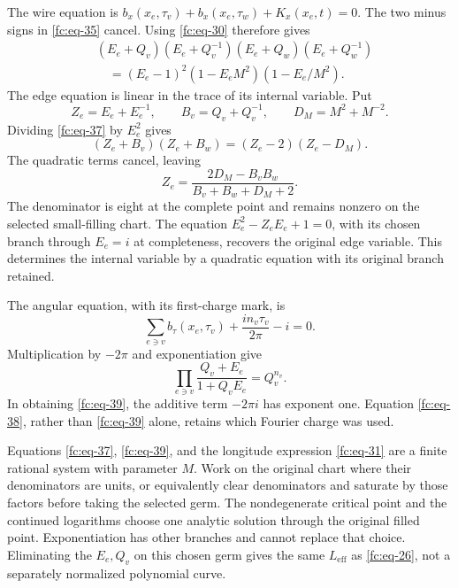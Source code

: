 The wire equation is \(b_x(x_e,\tau_v)+b_x(x_e,\tau_w)+K_x(x_e,t)=0\). The two minus signs in \eqref{fc:eq-35} cancel. Using \eqref{fc:eq-30} therefore gives
\begin{equation}\label{fc:eq-37}
\begin{aligned}
 &(E_e+Q_v)(E_e+Q_v^{-1})
   (E_e+Q_w)(E_e+Q_w^{-1})\\
 &\quad=(E_e-1)^2(1-E_eM^2)(1-E_e/M^2).
 \end{aligned}
\end{equation}
 The edge equation is linear in the trace of its internal variable. Put
\begin{equation}\label{fc:eq-37a}
Z_e=E_e+E_e^{-1},\qquad B_v=Q_v+Q_v^{-1},\qquad
 D_M=M^2+M^{-2}.
\end{equation}
 Dividing \eqref{fc:eq-37} by \(E_e^2\) gives \[
 (Z_e+B_v)(Z_e+B_w)=(Z_e-2)(Z_e-D_M).
\] The quadratic terms cancel, leaving
\begin{equation}\label{fc:eq-37b}
Z_e=\frac{2D_M-B_vB_w}{B_v+B_w+D_M+2}.
\end{equation}
 The denominator is eight at the complete point and remains nonzero on the selected small-filling chart. The equation \(E_e^2-Z_eE_e+1=0\), with its chosen branch through \(E_e=i\) at completeness, recovers the original edge variable. This determines the internal variable by a quadratic equation with its original branch retained.

The angular equation, with its first-charge mark, is
\begin{equation}\label{fc:eq-38}
\sum_{e\ni v}b_\tau(x_e,\tau_v)
          +\frac{i n_v\tau_v}{2\pi}-i=0.
\end{equation}
 Multiplication by \(-2\pi\) and exponentiation give
\begin{equation}\label{fc:eq-39}
\prod_{e\ni v}\frac{Q_v+E_e}{1+Q_vE_e}=Q_v^{n_v}.
\end{equation}
 In obtaining \eqref{fc:eq-39}, the additive term \(-2\pi i\) has exponent one. Equation \eqref{fc:eq-38}, rather than \eqref{fc:eq-39} alone, retains which Fourier charge was used.

Equations \eqref{fc:eq-37}, \eqref{fc:eq-39}, and the longitude expression \eqref{fc:eq-31} are a finite rational system with parameter \(M\). Work on the original chart where their denominators are units, or equivalently clear denominators and saturate by those factors before taking the selected germ. The nondegenerate critical point and the continued logarithms choose one analytic solution through the original filled point. Exponentiation has other branches and cannot replace that choice. Eliminating the \(E_e,Q_v\) on this chosen germ gives the same \(L_{\mathrm{eff}}\) as \eqref{fc:eq-26}, not a separately normalized polynomial curve.

